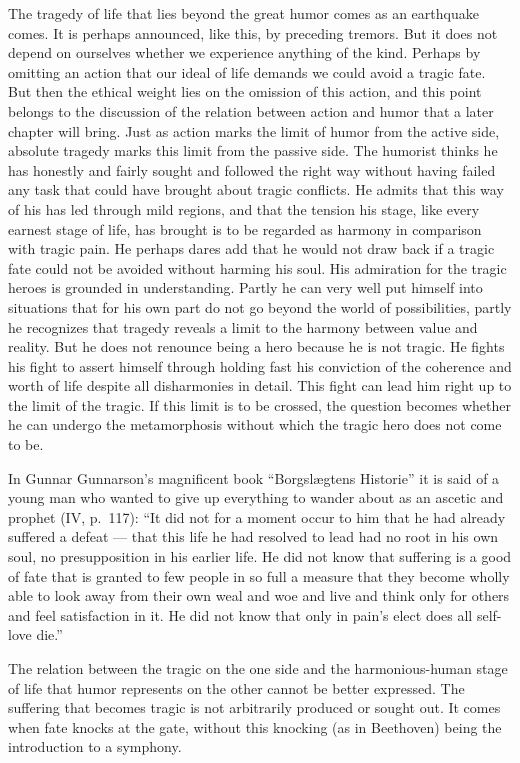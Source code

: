 \documentclass[12pt]{book}
\newcommand{\opage}[1]{\marginnote{\footnotesize\textit{[#1]}}}
\begin{document}
The tragedy of life that lies beyond the great humor comes as an earthquake comes. It is
perhaps announced, like this, by preceding tremors. But it does not depend on ourselves
whether we experience anything of the kind. Perhaps by omitting an action that our ideal
of life demands we could avoid a tragic fate. But then the ethical weight lies on the
omission of this action, and this point belongs to the discussion of the relation between
action and humor that a later chapter will bring. Just as action marks the limit of humor
from the active side, absolute tragedy marks this limit from the passive side. The humorist
thinks he has honestly and fairly sought and followed the right way without having failed
any task that could have brought about tragic conflicts. He admits that this way of his has
led through mild regions, and that the tension his stage, like every earnest stage of life,
has brought is to be regarded as harmony in comparison with tragic pain. He perhaps dares
add that he would not draw back if a tragic fate could not be avoided without harming
his soul. His admiration for the tragic heroes is grounded in understanding. Partly
\opage{104}he can very well put himself into situations that for his own part do not
go beyond the world of possibilities, partly he recognizes that tragedy reveals a limit
to the harmony between value and reality. But he does not renounce being a hero because
he is not tragic. He fights his fight to assert himself through holding fast his
conviction of the coherence and worth of life despite all disharmonies in detail. This
fight can lead him right up to the limit of the tragic. If this limit is to be crossed,
the question becomes whether he can undergo the metamorphosis without which the tragic
hero does not come to be.

In Gunnar Gunnarson's magnificent book ``Borgslægtens Historie'' it is said of a young
man who wanted to give up everything to wander about as an ascetic and prophet (IV,
p.~117): ``It did not for a moment occur to him that he had already suffered a defeat ---
that this life he had resolved to lead had no root in his own soul, no presupposition in
his earlier life. He did not know that suffering is a good of fate that is granted to
few people in so full a measure that they become wholly able to look away from their own
weal and woe and live and think only for others and feel satisfaction in it. He did not
know that only in pain's elect does all self-love die.''

The relation between the tragic on the one side and the harmonious-human stage of life
that humor represents on the other cannot be better expressed. The suffering that becomes
tragic is not arbitrarily produced or sought out. It comes when fate knocks at the gate,
without this knocking (as in Beethoven) being the introduction to a symphony.
\end{document}
